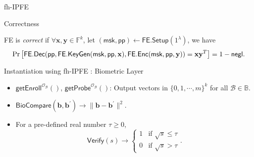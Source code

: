 \begin{frame}{fh-IPFE}

\begin{block}{Correctness}

	\textsf{FE} is \emph{correct} if $\forall \mathbf{x}, \mathbf{y} \in \mathbb{F}^k$, let $(\textsf{msk}, \textsf{pp}) \gets \textsf{FE.Setup}(1^\lambda)$, we have
	\[
		\Pr \left[ \textsf{FE.Dec}( \textsf{pp}, \textsf{FE.KeyGen}(\textsf{msk}, \textsf{pp}, \mathbf{x}), \textsf{FE.Enc}(\textsf{msk}, \textsf{pp}, \mathbf{y}) ) = \mathbf{x} \mathbf{y}^T \right] = 1 - \mathsf{negl}.
	\]

\end{block}

\end{frame}



\begin{frame}{Instantiation using fh-IPFE \cite{cryptoeprint:2023/481}: Biometric Layer}

\begin{itemize}
	\item<1-> $\textsf{getEnroll}^{\mathcal{O}_{\mathcal{B}}}()$, $\textsf{getProbe}^{\mathcal{O}_{\mathcal{B}}}()$: Output vectors in $ \{0, 1, \cdots, m \}^k$ for all $\mathcal{B} \in \mathbb{B}$.

	\item<2-> $\textsf{BioCompare}(\mathbf{b}, \mathbf{b}^\prime) \to \| \mathbf{b} - \mathbf{b}^\prime\|^2$.

	\item<3-> For a pre-defined real number $\tau \geq 0$,
	\[
		\textsf{Verify}(s) \to 
		\begin{cases} 
			1 & \text{if } \sqrt{s} \leq \tau \\
			0 & \text{if } \sqrt{s} > \tau 
		\end{cases}.
	\]

\end{itemize}

\end{frame}


